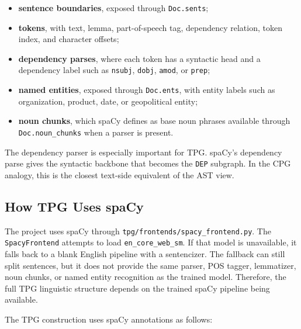 \documentclass[11pt]{article}
\begin{document}
\begin{itemize}
    \item \textbf{sentence boundaries}, exposed through \texttt{Doc.sents};
    \item \textbf{tokens}, with text, lemma, part-of-speech tag, dependency
    relation, token index, and character offsets;
    \item \textbf{dependency parses}, where each token has a syntactic head and
    a dependency label such as \texttt{nsubj}, \texttt{dobj},
    \texttt{amod}, or \texttt{prep};
    \item \textbf{named entities}, exposed through \texttt{Doc.ents}, with
    entity labels such as organization, product, date, or geopolitical entity;
    \item \textbf{noun chunks}, which spaCy defines as base noun phrases
    available through \texttt{Doc.noun\_chunks} when a parser is present.
\end{itemize}

The dependency parser is especially important for TPG. spaCy's dependency
parse gives the syntactic backbone that becomes the \texttt{DEP} subgraph. In
the CPG analogy, this is the closest text-side equivalent of the AST view.

\subsection{How TPG Uses spaCy}

The project uses spaCy through \texttt{tpg/frontends/spacy\_frontend.py}. The
\texttt{SpacyFrontend} attempts to load \texttt{en\_core\_web\_sm}. If that
model is unavailable, it falls back to a blank English pipeline with a
sentencizer. The fallback can still split sentences, but it does not provide
the same parser, POS tagger, lemmatizer, noun chunks, or named entity
recognition as the trained model. Therefore, the full TPG linguistic structure
depends on the trained spaCy pipeline being available.

The TPG construction uses spaCy annotations as follows:
\end{document}
